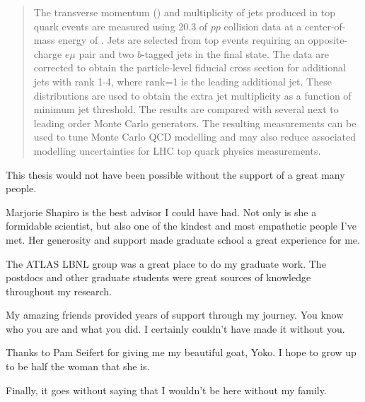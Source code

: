 \documentclass[12pt]{ucbthesis}
\begin{document}
\maketitle
\copyrightpage
\begin{abstract}
 The transverse momentum (\pt) and multiplicity of jets produced in top quark events are measured using 20.3 \ifb of $pp$ collision data at a center-of-mass energy of  \tev. Jets are selected from top events requiring an opposite-charge $e\mu$ pair and two $b$-tagged jets in the final state. 
The data are corrected to obtain the particle-level fiducial cross section \sigmapt for additional jets with rank 1-4, where rank=1 is the leading additional jet. These distributions are used to obtain the extra jet multiplicity as a function of minimum jet \pt threshold. The results are compared with several next to leading order Monte Carlo generators. The resulting measurements can be used to tune Monte Carlo QCD modelling and may also reduce associated modelling uncertainties for LHC top quark physics measurements.
\end{abstract}
\begin{frontmatter}

\tableofcontents
\clearpage
\listoffigures
\clearpage
\listoftables

\begin{acknowledgements}
This thesis would not have been possible without the support of a great many people. 

Marjorie Shapiro is the best advisor I could have had. Not only is she a formidable scientist, but also one of the kindest and most empathetic people I've met. Her generosity and support made graduate school a great experience for me.

The ATLAS LBNL group was a great place to do my graduate work. The postdocs and other graduate students were great sources of knowledge throughout my research.

My amazing friends provided years of support through my journey. You know who you are and what you did. I certainly couldn't have made it without you.

Thanks to Pam Seifert for giving me my beautiful goat, Yoko. I hope to grow up to be half the woman that she is.

Finally, it goes without saying that I wouldn't be here without my family. 


\end{acknowledgements}

\end{frontmatter}
\end{document}
